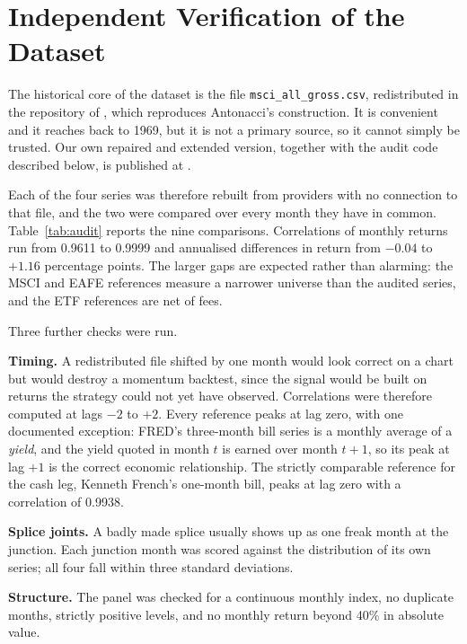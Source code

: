 \documentclass[11pt,a4paper]{article}
\begin{document}
\section{Independent Verification of the Dataset}
\label{app:audit}

The historical core of the dataset is the file \texttt{msci\_all\_gross.csv},
redistributed in the repository of \citet{jansengem}, which reproduces
Antonacci's construction. It is convenient and it reaches back to 1969, but it
is not a primary source, so it cannot simply be trusted. Our own repaired and
extended version, together with the audit code described below, is published at
\citet{petit2026data}.

\begin{table}[H]
  \centering
  \caption{The dataset against independent sources.}
  \label{tab:audit}
  
\end{table}

Each of the four series was therefore rebuilt from providers with no connection
to that file, and the two were compared over every month they have in common.
Table~\ref{tab:audit} reports the nine comparisons. Correlations of monthly
returns run from 0.9611 to 0.9999 and annualised differences in return from
$-0.04$ to $+1.16$ percentage points. The larger gaps are expected rather than
alarming: the MSCI and EAFE references measure a narrower universe than the
audited series, and the ETF references are net of fees.

Three further checks were run.

\textbf{Timing.} A redistributed file shifted by one month would look correct
on a chart but would destroy a momentum backtest, since the signal would be
built on returns the strategy could not yet have observed. Correlations were
therefore computed at lags $-2$ to $+2$. Every reference peaks at lag zero,
with one documented exception: FRED's three-month bill series is a monthly
average of a \emph{yield}, and the yield quoted in month $t$ is earned over
month $t+1$, so its peak at lag $+1$ is the correct economic relationship. The
strictly comparable reference for the cash leg, Kenneth French's one-month
bill, peaks at lag zero with a correlation of 0.9938.

\textbf{Splice joints.} A badly made splice usually shows up as one freak month
at the junction. Each junction month was scored against the distribution of its
own series; all four fall within three standard deviations.

\textbf{Structure.} The panel was checked for a continuous monthly index, no
duplicate months, strictly positive levels, and no monthly return beyond 40\%
in absolute value.
\end{document}
